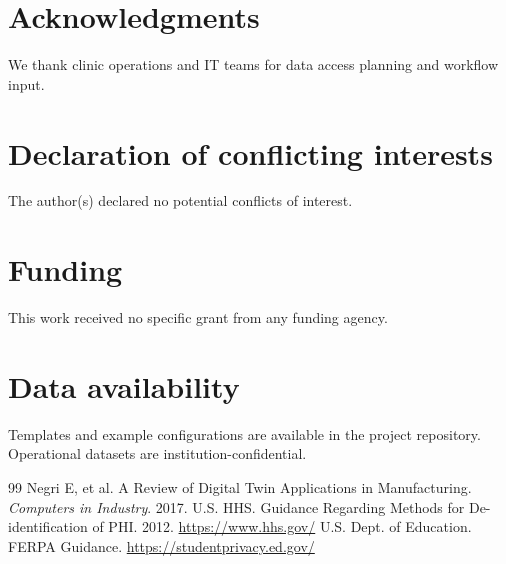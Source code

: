 \documentclass[Afour,sageh,times]{sagej}
\begin{document}
\section*{Acknowledgments}
We thank clinic operations and IT teams for data access planning and workflow input.

\section*{Declaration of conflicting interests}
The author(s) declared no potential conflicts of interest.

\section*{Funding}
This work received no specific grant from any funding agency.

\section*{Data availability}
Templates and example configurations are available in the project repository. Operational datasets are institution-confidential.

\begin{thebibliography}{99}\setlength{\itemsep}{2pt}
Negri E, et al. A Review of Digital Twin Applications in Manufacturing. \emph{Computers in Industry}. 2017.
U.S. HHS. Guidance Regarding Methods for De-identification of PHI. 2012. \url{https://www.hhs.gov/}
U.S. Dept. of Education. FERPA Guidance. \url{https://studentprivacy.ed.gov/}
\end{thebibliography}
\end{document}
